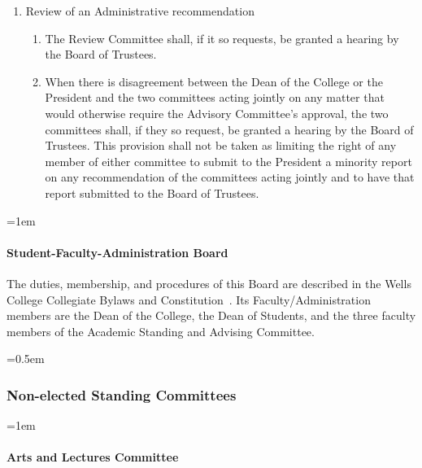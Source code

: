\documentclass{manual}
\newcommand{\constitution}{Wells College Collegiate Bylaws and Constitution~}
\let\oldsubsubsection\subsubsection
\renewcommand\subsubsection{\leftskip=0.5em\oldsubsubsection}
\let\oldparagraph\paragraph
\renewcommand\paragraph{\leftskip=1em\oldparagraph}
\newcommand{\itemLevelA}{\alph*.}
\newcommand{\itemLevelB}{\arabic*)}
\newcommand{\itemLevelC}{\alph*)}
\newcommand{\itemRefA}{\alph*}
\newcommand{\itemRefB}{\arabic*}
\newcommand{\itemRefC}{\alph*}
\begin{document}
\begin{enumerate}[label=\itemLevelA,ref=\itemRefA]
\begin{enumerate}[label=\itemLevelB,ref=\itemRefB]
\begin{enumerate}[label=\itemLevelC,ref=\itemRefC]
\end{enumerate}

\item Review of an Administrative recommendation
\begin{enumerate}[label=\itemLevelC,ref=\itemRefC]
\item The Review Committee shall, if it so requests, be granted a hearing by the Board of Trustees.
\item When there is disagreement between the Dean of the College or the President and the two committees acting jointly on any matter that would otherwise require the Advisory Committee's approval, the two committees shall, if they so request, be granted a hearing by the Board of Trustees. This provision shall not be taken as limiting the right of any member of either committee to submit to the President a minority report on any recommendation of the committees acting jointly and to have that report submitted to the Board of Trustees.

\end{enumerate}

\end{enumerate}
\end{enumerate}

\paragraph{Student-Faculty-Administration Board}

The duties, membership, and procedures of this Board are described in the \constitution. Its Faculty/Administration members are the Dean of the College, the Dean of Students, and the three faculty members of the Academic Standing and Advising Committee.

\subsubsection{Non-elected Standing Committees}

\paragraph{Arts and Lectures Committee}
\end{document}
